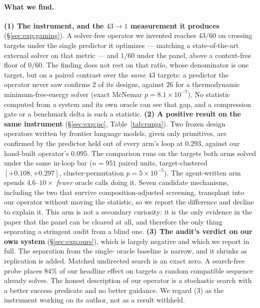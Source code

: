 \documentclass[11pt]{article}
\begin{document}
\paragraph{What we find.} \textbf{(1) The instrument, and the $43\!\to\!1$ measurement it produces}
(\S\ref{sec:exp:gaming}). A solver-free operator we invented reaches $43/60$ on crossing targets under the
single predictor it optimizes --- matching a state-of-the-art external solver on that metric --- and $1/60$
under the panel, above a context-free floor of $0/60$. The finding does not rest on that ratio, whose
denominator is one target, but on a paired contrast over the \emph{same} $43$ targets: a predictor the
operator never saw confirms $2$ of its designs, against $26$ for a thermodynamic minimum-free-energy solver
(exact McNemar $p{=}8.1\!\times\!10^{-7}$). No statistic computed from a system and its own oracle can see
that gap, and a compression gate or a benchmark delta is such a statistic. \textbf{(2) A positive result on
the same instrument} (\S\ref{sec:exp:pc}, Table~\ref{tab:rungs}). Two frozen design operators written by frontier language models, given only primitives, are confirmed by the
predictor held out of every arm's loop at $0.293$, against our hand-built operator's $0.095$. The comparison
runs on the targets both arms solved under the same in-loop bar ($n{=}951$ paired units, target-clustered
$[{+}0.108,{+}0.297]$, cluster-permutation $p{=}5\!\times\!10^{-5}$). The agent-written arm spends
$4.6$--$10\times$ \emph{fewer} oracle calls doing it. Seven candidate
mechanisms, including the two that survive composition-adjusted screening, transplant into our operator
without moving the statistic, so we report the difference and decline to explain it. This arm is not a
secondary curiosity: it is the only evidence in the paper that the panel can be cleared at all, and therefore
the only thing separating a stringent audit from a blind one. \textbf{(3) The audit's verdict on our own
system} (\S\ref{sec:exp:ours}), which is largely negative and which we report in full. The separation from the single-
oracle baseline is narrow, and it shrinks as replication is added. Matched undirected search is an exact zero. A
search-free probe places $84\%$ of our headline effect on targets a random compatible sequence already solves. The honest description of our operator is a stochastic search with a better success predicate
and no better guidance. We regard (3) as the instrument working on its author, not as a result withheld.
\end{document}
